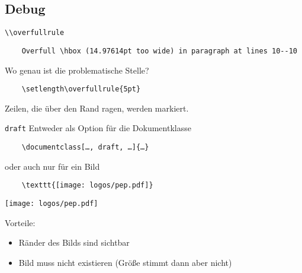 \subsection{Debug}

\begin{frame}[fragile]{\lstinline[texcsstyle=*\color{white}]+\\overfullrule+}

  \vspace{\baselineskip}
  \begin{lstlisting}
    Overfull \hbox (14.97614pt too wide) in paragraph at lines 10--10
  \end{lstlisting}
  Wo genau ist die problematische Stelle?

  \vspace{\baselineskip}
  \begin{lstlisting}
    \setlength\overfullrule{5pt}
  \end{lstlisting}

  \setlength\overfullrule{5pt}

  \vspace{\baselineskip}
  Zeilen, die über den Rand ragen, werden markiert.
\end{frame}

\begin{frame}[fragile]{\texttt{draft}}
  Entweder als Option für die Dokumentklasse
  \begin{lstlisting}
    \documentclass[…, draft, …]{…}
  \end{lstlisting}
  oder auch nur für ein Bild
  \begin{lstlisting}
    \texttt{[image: logos/pep.pdf]}
  \end{lstlisting}
  \texttt{[image: logos/pep.pdf]}

  Vorteile:
  \begin{itemize}
    \item Ränder des Bilds sind sichtbar
    \item Bild muss nicht existieren (Größe stimmt dann aber nicht)
  \end{itemize}
\end{frame}

